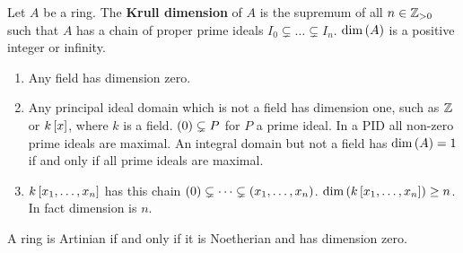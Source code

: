 \begin{definition}
Let $ A $ be a ring. The \textbf{Krull dimension} of $ A $ is the supremum of all $ n \in \Z_{> 0} $ such that $ A $ has a chain of proper prime ideals $ I_0 \subsetneq \dots \subsetneq I_n $. $ \dim\rb{A} $ is a positive integer or infinity.
\end{definition}

\begin{example*}
\hfill
\begin{enumerate}
\item Any field has dimension zero.
\item Any principal ideal domain which is not a field has dimension one, such as $ \Z $ or $ k\sb{x} $, where $ k $ is a field. $ \rb{0} \subsetneq P $ for $ P $ a prime ideal. In a PID all non-zero prime ideals are maximal. An integral domain but not a field has $ \dim\rb{A} = 1 $ if and only if all prime ideals are maximal.
\item $ k\sb{x_1, \dots, x_n} $ has this chain $ \rb{0} \subsetneq \dots \subsetneq \rb{x_1, \dots, x_n} $. $ \dim\rb{k\sb{x_1, \dots, x_n}} \ge n $. In fact dimension is $ n $.
\end{enumerate}
\end{example*}

\begin{theorem}
A ring is Artinian if and only if it is Noetherian and has dimension zero.
\end{theorem}

